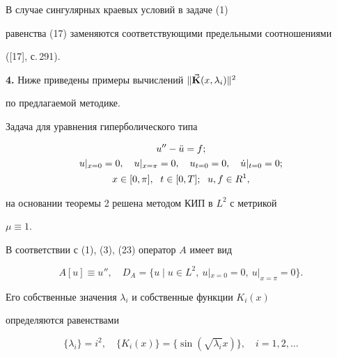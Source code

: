 


\begin{notenonum} В случае сингулярных краевых условий в задаче (1) 


равенства (17) заменяются соответствующими предельными соотношениями 


([17], с.\,291). 


\end{notenonum} 


 


{\bf 4.} Ниже приведены примеры вычислений $\|\Vec{\bold{K}}(x,\lambda_i)\|^2$ 


по предлагаемой методике. 


 


\begin{exam} Задача для уравнения гиперболического типа 


\begin{gather} 


u''-\Ddot u=f;\notag\\ 


u|_{x=0}=0,\quad u|_{x=\pi}=0,\quad 


u_{t=0}=0,\quad \Dot u|_{t=0}=0;\\ 


x\in[0,\pi],\ \; t\in[0,T];\ \; u,f\in R^1,\notag 


\end{gather} 


на основании теоремы 2 решена методом КИП в $L^2$ с метрикой 


$\mu\equiv1$. 


В соответствии с (1), (3), (23) оператор $A$ имеет вид 


$$ 


A[u]\equiv u'',\quad D_A=\{u\mid u\in L^2,\ u|_{x=0}=0, 


\ u|_{x=\pi}=0\}. 


$$ 


Его собственные значения $\lambda_i$ и собственные функции $K_i(x)$ 


определяются равенствами 


\begin{equation} 


\{\lambda_i\}=i^2,\quad 


\{K_i(x)\}=\{\sin(\sqrt{\lambda_i}x)\},\quad i=1,2,\dotsc 


\end{equation} 



\end{exam}
